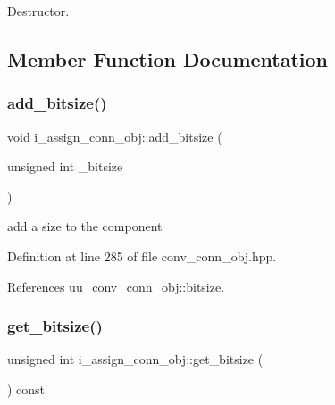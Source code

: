 Destructor. 



\subsection{Member Function Documentation}
\mbox{\label{classi__assign__conn__obj_a60ae115cd0503e92eae2a42b0b2ae456}} 
\subsubsection{\texorpdfstring{add\+\_\+bitsize()}{add\_bitsize()}}
{\footnotesize\ttfamily void i\+\_\+assign\+\_\+conn\+\_\+obj\+::add\+\_\+bitsize (\begin{DoxyParamCaption}\item[{unsigned int}]{\+\_\+bitsize }\end{DoxyParamCaption})\hspace{0.3cm}{\ttfamily [inline]}}



add a size to the component 



Definition at line 285 of file conv\+\_\+conn\+\_\+obj.\+hpp.



References uu\+\_\+conv\+\_\+conn\+\_\+obj\+::bitsize.

\mbox{\label{classi__assign__conn__obj_a5fafefd0507bf959d2c0fc1810616674}} 
\subsubsection{\texorpdfstring{get\+\_\+bitsize()}{get\_bitsize()}}
{\footnotesize\ttfamily unsigned int i\+\_\+assign\+\_\+conn\+\_\+obj\+::get\+\_\+bitsize (\begin{DoxyParamCaption}{ }\end{DoxyParamCaption}) const\hspace{0.3cm}{\ttfamily [inline]}}



